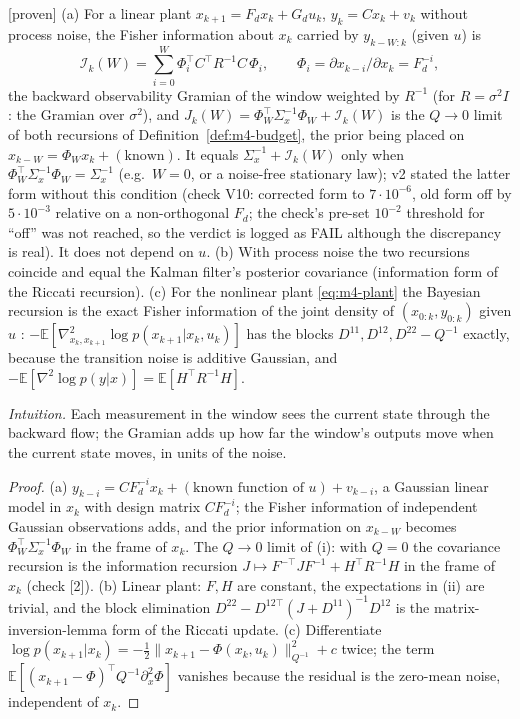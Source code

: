 \begin{proposition}\label{prop:m4-gramian}
[proven] (a) For a linear plant $x_{k+1}=F_dx_k+G_du_k$, $y_k=Cx_k+v_k$ without process noise, the Fisher
information about $x_k$ carried by $y_{k-W:k}$ (given $u$) is
\[
\mathcal I_k(W)=\sum_{i=0}^{W}\Phi_i^\top C^\top R^{-1}C\,\Phi_i,\qquad \Phi_i=\partial x_{k-i}/\partial x_k=F_d^{-i},
\]
the backward observability Gramian of the window weighted by $R^{-1}$ (for $R=\sigma^2I$: the Gramian over
$\sigma^2$), and  $J_k(W)=\Phi_W^\top\Sigma_x^{-1}\Phi_W+\mathcal I_k(W)$ is the
$Q\to0$ limit of both recursions of Definition~\ref{def:m4-budget}, the prior being placed on $x_{k-W}=\Phi_Wx_k+(\text{known})$.
It equals $\Sigma_x^{-1}+\mathcal I_k(W)$ only when $\Phi_W^\top\Sigma_x^{-1}\Phi_W=\Sigma_x^{-1}$ (e.g.\ $W=0$, or a
noise-free stationary law); v2 stated the latter form without this condition (check V10: corrected form to $7\cdot10^{-6}$,
old form off by $5\cdot10^{-3}$ relative on a non-orthogonal $F_d$; the check's pre-set $10^{-2}$ threshold for
``off'' was not reached, so the verdict is logged as FAIL although the discrepancy is real). It does not depend on $u$. (b) With process noise the two recursions coincide and
equal the Kalman filter's posterior covariance (information form of the Riccati recursion). (c) For the nonlinear
plant \eqref{eq:m4-plant} the Bayesian recursion is the exact Fisher information of the joint density of
$(x_{0:k},y_{0:k})$ given $u$ \citep[Prop.~1]{tichavsky1998posterior}: $-\mathbb E[\nabla^2_{x_k,x_{k+1}}\log p(x_{k+1}|x_k,u_k)]$
has the blocks $D^{11},D^{12},D^{22}-Q^{-1}$ exactly, because the transition noise is additive Gaussian, and
$-\mathbb E[\nabla^2\log p(y|x)]=\mathbb E[H^\top R^{-1}H]$.
\end{proposition}
\emph{Intuition.} Each measurement in the window sees the current state through the backward flow; the Gramian
adds up how far the window's outputs move when the current state moves, in units of the noise.
\begin{proof}
(a) $y_{k-i}=C F_d^{-i}x_k+(\text{known function of }u)+v_{k-i}$, a Gaussian linear model in $x_k$ with design
matrix $CF_d^{-i}$; the Fisher information of independent Gaussian observations adds, and the prior information on
$x_{k-W}$ becomes $\Phi_W^\top\Sigma_x^{-1}\Phi_W$ in the frame of $x_k$. The $Q\to0$ limit of (i):
with $Q=0$ the covariance recursion is the information recursion $J\mapsto F^{-\top}JF^{-1}+H^\top R^{-1}H$ in
the frame of $x_k$ (check [2]). (b) Linear plant: $F,H$ are constant, the expectations in (ii) are trivial, and
the block elimination $D^{22}-D^{12\top}(J+D^{11})^{-1}D^{12}$ is the matrix-inversion-lemma form of the Riccati
update. (c) Differentiate $\log p(x_{k+1}|x_k)=-\tfrac12\|x_{k+1}-\Phi(x_k,u_k)\|^2_{Q^{-1}}+c$ twice; the term
$\mathbb E[(x_{k+1}-\Phi)^\top Q^{-1}\partial^2_{x}\Phi]$ vanishes because the residual is the zero-mean noise,
independent of $x_k$.
\end{proof}

